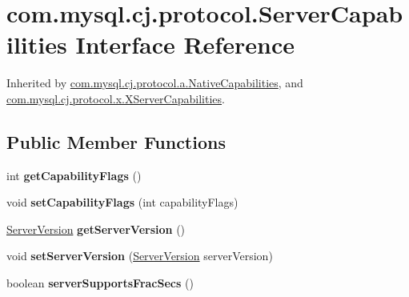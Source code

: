\hypertarget{interfacecom_1_1mysql_1_1cj_1_1protocol_1_1_server_capabilities}{}\section{com.\+mysql.\+cj.\+protocol.\+Server\+Capabilities Interface Reference}
\label{interfacecom_1_1mysql_1_1cj_1_1protocol_1_1_server_capabilities}


Inherited by \mbox{\hyperlink{classcom_1_1mysql_1_1cj_1_1protocol_1_1a_1_1_native_capabilities}{com.\+mysql.\+cj.\+protocol.\+a.\+Native\+Capabilities}}, and \mbox{\hyperlink{classcom_1_1mysql_1_1cj_1_1protocol_1_1x_1_1_x_server_capabilities}{com.\+mysql.\+cj.\+protocol.\+x.\+X\+Server\+Capabilities}}.

\subsection*{Public Member Functions}
\begin{DoxyCompactItemize}
\item 
\mbox{\label{interfacecom_1_1mysql_1_1cj_1_1protocol_1_1_server_capabilities_a9f0922d4351d008218162eaa73d37536}} 
int {\bfseries get\+Capability\+Flags} ()
\item 
\mbox{\label{interfacecom_1_1mysql_1_1cj_1_1protocol_1_1_server_capabilities_ab5da8f1853ad82353d0446b785d98ee2}} 
void {\bfseries set\+Capability\+Flags} (int capability\+Flags)
\item 
\mbox{\label{interfacecom_1_1mysql_1_1cj_1_1protocol_1_1_server_capabilities_a08a31377b5af7f20476eaea763c05a15}} 
\mbox{\hyperlink{classcom_1_1mysql_1_1cj_1_1_server_version}{Server\+Version}} {\bfseries get\+Server\+Version} ()
\item 
\mbox{\label{interfacecom_1_1mysql_1_1cj_1_1protocol_1_1_server_capabilities_a4474ed857120dcbd9148d3b94e2962ac}} 
void {\bfseries set\+Server\+Version} (\mbox{\hyperlink{classcom_1_1mysql_1_1cj_1_1_server_version}{Server\+Version}} server\+Version)
\item 
\mbox{\label{interfacecom_1_1mysql_1_1cj_1_1protocol_1_1_server_capabilities_aebc6a8a4326d4af70a1919bb99483524}} 
boolean {\bfseries server\+Supports\+Frac\+Secs} ()
\end{DoxyCompactItemize}


